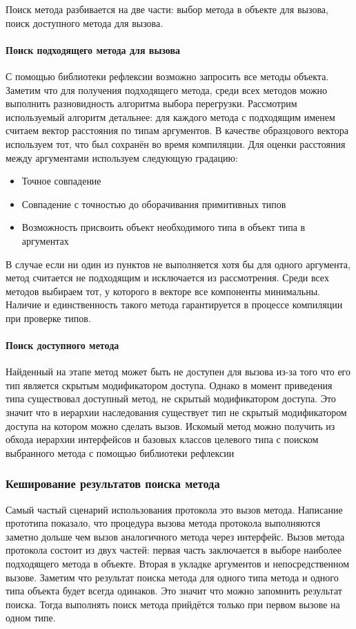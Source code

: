 Поиск метода разбивается на две части: выбор метода в объекте для вызова, поиск доступного метода для вызова.

\paragraph{Поиск подходящего метода для вызова}
С помощью библиотеки рефлексии возможно запросить все методы объекта. Заметим что для получения подходящего метода, среди всех методов можно выполнить разновидность алгоритма выбора перегрузки. Рассмотрим используемый алгоритм детальнее: для каждого метода с подходящим именем считаем вектор расстояния по типам аргументов. В качестве образцового вектора используем тот, что был сохранён во время компиляции. Для оценки расстояния между аргументами используем следующую градацию:

\begin{itemize}
    \item Точное совпадение
    \item Совпадение с точностью до оборачивания примитивных типов
    \item Возможность присвоить объект необходимого типа в объект типа в аргументах
\end{itemize}

В случае если ни один из пунктов не выполняется хотя бы для одного аргумента, метод считается не подходящим и исключается из рассмотрения. Среди всех методов выбираем тот, у которого в векторе все компоненты минимальны. Наличие и единственность такого метода гарантируется в процессе компиляции при проверке типов.

\paragraph{Поиск доступного метода}
Найденный на этапе метод может быть не доступен для вызова из-за того что его тип является скрытым модификатором доступа. Однако в момент приведения типа существовал доступный метод, не скрытый модификатором доступа. Это значит что в иерархии наследования существует тип не скрытый модификатором доступа на котором можно сделать вызов. Искомый метод можно получить из обхода иерархии интерфейсов и базовых классов целевого типа с поиском выбранного метода с помощью библиотеки рефлексии

\subsubsection{Кеширование результатов поиска метода}
Самый частый сценарий использования протокола это вызов метода. Написание прототипа показало, что процедура вызова метода протокола выполняются заметно дольше чем вызов аналогичного метода через интерфейс. Вызов метода протокола состоит из двух частей: первая часть заключается в выборе наиболее подходящего метода в объекте. Вторая в укладке аргументов и непосредственном вызове. Заметим что результат поиска метода для одного типа метода и одного типа объекта будет всегда одинаков. Это значит что можно запомнить результат поиска. Тогда выполнять поиск метода прийдётся только при первом вызове на одном типе.

